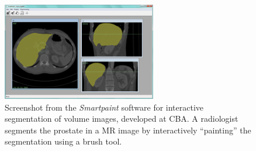 \documentclass[10pt, a4paper]{article}
\begin{document}
\begin{enumerate}
\begin{figure}[!h]
\centering
\includegraphics[width=0.6\textwidth]{figures/research/SP_Screenshot.png}
\caption{\label{fig:smartpaint} Screenshot from the \emph{Smartpaint} software for interactive segmentation of volume images, developed at CBA. A radiologist segments the prostate in a MR image by interactively ``painting'' the segmentation using a brush tool.} 
\end{figure}



\end{enumerate}
\end{document}
